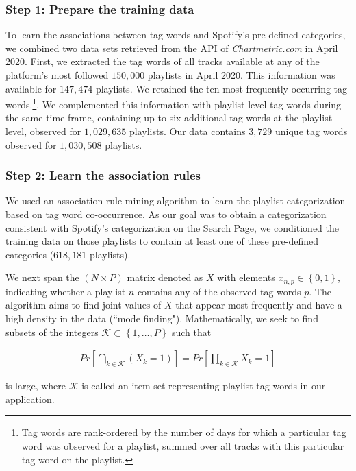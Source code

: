 \documentclass[12pt, a4paper, leqno]{article}
\begin{document}
\subsubsection*{Step 1: Prepare the training data}

To learn the associations between tag words and Spotify's pre-defined categories, we combined two data sets retrieved from the API of \textit{Chartmetric.com} in April 2020. First, we extracted the tag words of all tracks available at any of the platform's most followed $150,000$ playlists in April 2020. This information was available for $147,474$ playlists. We retained the ten most frequently occurring tag words.\footnote{Tag words are rank-ordered by the number of days for which a particular tag word was observed for a playlist, summed over all tracks with this particular tag word on the playlist.}. We complemented this information with playlist-level tag words during the same time frame, containing up to six additional tag words at the playlist level, observed for $1,029,635$ playlists. Our data contains $3,729$ unique tag words observed for $1,030,508$ playlists. 

\subsubsection*{Step 2: Learn the association rules}

We used an association rule mining algorithm \citep[e.g.,][]{hastie_09} to learn the playlist categorization based on tag word co-occurrence. As our goal was to obtain a categorization consistent with Spotify's categorization on the Search Page, we conditioned the training data on those playlists to contain at least one of these pre-defined categories ($618,181$ playlists).

We next span the $(N \times P)$ matrix denoted as $X$ with elements $x_{n,p} \in \left\{0,1\right\}$, indicating whether a playlist $n$ contains any of the observed tag words $p$. The algorithm aims to find joint values of $X$ that appear most frequently and have a high density in the data (``mode finding"). Mathematically, we seek to find subsets of the integers $\mathcal{K} \subset \left\{1,\dots,P\right\}$ such that 

\begin{align}
    Pr\left[\bigcap_{k \in \mathcal{K}} (X_k = 1)\right] = Pr\left[\prod_{k \in \mathcal{K}} X_k = 1\right]
\end{align}

is large, where $\mathcal{K}$ is called an item set representing playlist tag words in our application. 
\end{document}
